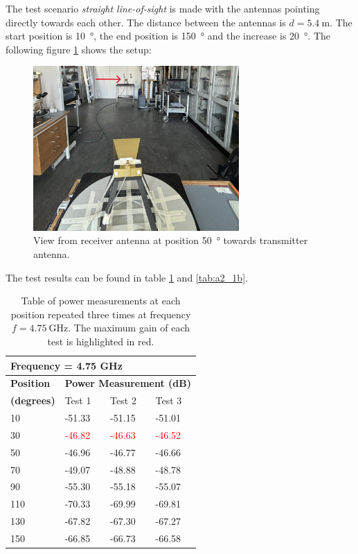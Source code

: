 The test scenario \textit{straight line-of-sight} is made with the antennas pointing directly towards each other. The distance between the antennas is $d=\SI{5.4}{\meter}$. The start position is \SI{10}{\degree}, the end position is \SI{150}{\degree} and the increase is \SI{20}{\degree}. The following figure \ref{fig:a2_1} shows the setup:
\begin{figure}[H]
    \centering
    \includegraphics[width=0.7\textwidth]{figures/test_los_straight.JPG}
    \caption{View from receiver antenna at position \SI{50}{\degree} towards transmitter antenna.} \label{fig:a2_1}
\end{figure}

The test results can be found in table \ref{tab:a2_1a} and \ref{tab:a2_1b}.
\begin{table}[H]
    \centering
    \begin{tabular}{l|l|l|l}
        \multicolumn{4}{l}{\textbf{Frequency = 4.75 GHz}}         \\
        \hline
        \textbf{Position} & \multicolumn{3}{l}{\textbf{Power Measurement (dB)}} \\
        \textbf{(degrees)}  & Test 1    & Test 2  & Test 3  \\
        \hline
        \hline
        10      & -51.33    & -51.15    & -51.01 \\
        30      & \textcolor{red}{-46.82}    & \textcolor{red}{-46.63}    & \textcolor{red}{-46.52} \\
        50      & -46.96    & -46.77    & -46.66 \\
        70      & -49.07    & -48.88    & -48.78 \\
        90      & -55.30    & -55.18    & -55.07 \\
        110     & -70.33    & -69.99    & -69.81 \\
        130     & -67.82    & -67.30    & -67.27 \\
        150     & -66.85    & -66.73    & -66.58
        \end{tabular}
    \caption{Table of power measurements at each position repeated three times at frequency $f=\SI{4.75}{\giga\hertz}$. The maximum gain of each test is highlighted in red.}
    \label{tab:a2_1a}
\end{table}

